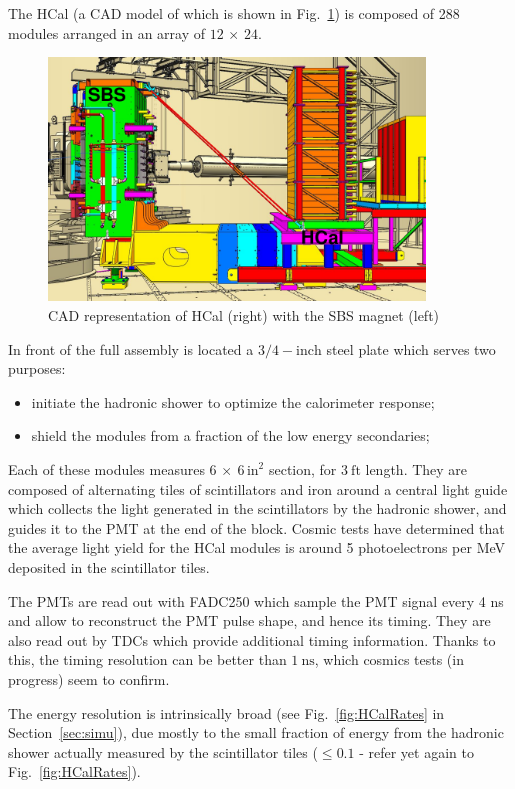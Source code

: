 The HCal (a CAD model of which is shown in Fig.~\ref{fig:hcal_cad})
is composed of 288 modules arranged in an array of $12\, \times \, 24$.
%
\begin{figure}[!h]
  \centering
    \includegraphics[width=10cm]{Plots/Wines_SBS_CAD_Fall2018.png}
    \caption{CAD representation of HCal (right) with the SBS magnet (left)}
    \label{fig:hcal_cad}
\end{figure}
%
In front of the full assembly is located a $3/4-\mathrm{inch}$ steel plate which serves two purposes:
%
\begin{itemize}
\item{initiate the hadronic shower to optimize the calorimeter response;}
\item{shield the modules from a fraction of the low energy secondaries;}
\end{itemize}
%
Each of these modules measures $6\,\times~6\,\mathrm{in}^2$ section, for $3~\mathrm{ft}$ length. They are composed of alternating tiles of scintillators and iron around a central light guide which collects the light generated in the scintillators by the hadronic shower, and guides it to the PMT at the end of the block.
Cosmic tests have determined that the average light yield for the HCal modules is around 5 photoelectrons per MeV deposited in the scintillator tiles.

The PMTs are read out with FADC250 which sample the PMT signal every 4 ns and allow to reconstruct the PMT pulse shape, and hence its timing.
They are also read out by TDCs which provide additional timing information.
Thanks to this, the timing resolution can be better than $1~\mathrm{ns}$, which cosmics tests (in progress) seem to confirm.

The energy resolution is intrinsically broad (see Fig.~\ref{fig:HCalRates} in Section~\ref{sec:simu}), due mostly to the small fraction of energy from the hadronic shower actually measured by the scintillator tiles ($\leq 0.1$ - refer yet again to Fig.~\ref{fig:HCalRates}).

